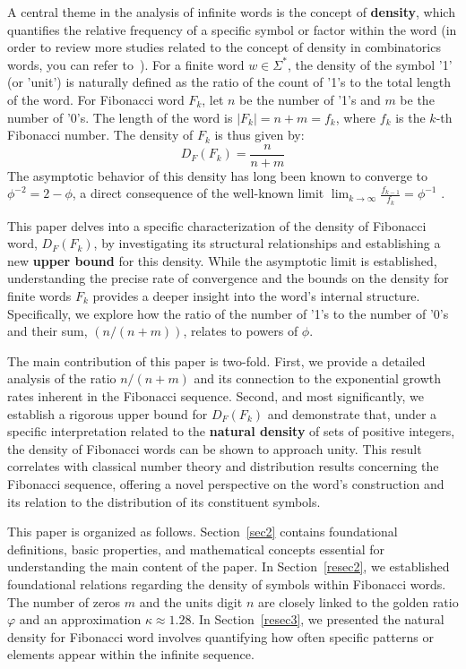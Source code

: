 \documentclass[11pt, a4paper]{article}
\theoremstyle{definition}
\begin{document}
A central theme in the analysis of infinite words is the concept of \textbf{density}, which quantifies the relative frequency of a specific symbol or factor within the word (in order to review more studies related to the concept of density in combinatorics words, you can refer to~\cite{Berstel2003,HeubachMansour,CoreglianoRazborov,DevroyeLugosi,Johnson01Weller}). For a finite word $w \in \Sigma^*$, the density of the symbol '1' (or 'unit') is naturally defined as the ratio of the count of '1's to the total length of the word. For Fibonacci word $F_k$, let $n$ be the number of '1's and $m$ be the number of '0's. The length of the word is $|F_k| = n+m = f_k$, where $f_k$ is the $k$-th Fibonacci number. The density of $F_k$ is thus given by:
$$
D_F(F_k) = \frac{n}{n+m}
$$
The asymptotic behavior of this density has long been known to converge to $\phi^{-2} = 2 - \phi$, a direct consequence of the well-known limit $\lim_{k \to \infty} \frac{f_{k-1}}{f_k} = \phi^{-1}$ \cite{Allouche2003}.

This paper delves into a specific characterization of the density of Fibonacci word, $D_F(F_k)$, by investigating its structural relationships and establishing a new \textbf{upper bound} for this density. While the asymptotic limit is established, understanding the precise rate of convergence and the bounds on the density for finite words $F_k$ provides a deeper insight into the word's internal structure. Specifically, we explore how the ratio of the number of '1's to the number of '0's and their sum, $(n/(n+m))$, relates to powers of $\phi$.

The main contribution of this paper is two-fold. First, we provide a detailed analysis of the ratio $n/(n+m)$ and its connection to the exponential growth rates inherent in the Fibonacci sequence. Second, and most significantly, we establish a rigorous upper bound for $D_F(F_k)$ and demonstrate that, under a specific interpretation related to the \textbf{natural density} of sets of positive integers, the density of Fibonacci words can be shown to approach unity. This result correlates with classical number theory and distribution results concerning the Fibonacci sequence, offering a novel perspective on the word's construction and its relation to the distribution of its constituent symbols.

This paper is organized as follows. Section~\ref{sec2} contains foundational definitions, basic properties, and mathematical concepts essential for understanding the main content of the paper. In Section~\ref{resec2}, we established foundational relations regarding the density of symbols within Fibonacci words. The number of zeros $m$ and the units digit $n$ are closely linked to the golden ratio $\varphi$ and an approximation $\kappa \approx 1.28$. In Section~\ref{resec3}, we presented the natural density for Fibonacci word involves quantifying how often specific patterns or elements appear within the infinite sequence.
\end{document}
